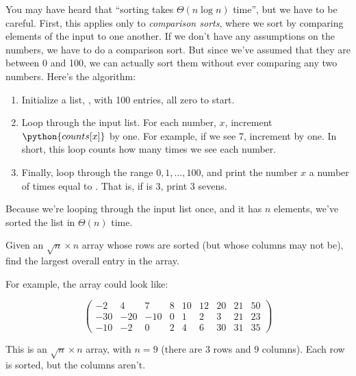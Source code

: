\begin{prob}
\begin{subprobset}
\begin{subprob}
\begin{soln}
                You may have heard that ``sorting takes $\Theta(n \log n)$ time'', but we have to be careful. First,
                this applies only to \emph{comparison sorts}, where we sort by comparing elements of the input to one another.
                If we don't have any assumptions on the numbers, we have to do a comparison sort. But since we've assumed that
                they are between 0 and 100, we can actually sort them without ever comparing any two numbers. Here's the algorithm:

                \begin{enumerate}
                    \item Initialize a list, , with 100 entries, all zero to start.
                    \item Loop through the input list. For each number, $x$, increment $\python{counts[x]}$ by one. For example, if we see
                        7, increment  by one. In short, this loop counts how many times we see each number.
                    \item Finally, loop through the range $0, 1, \ldots, 100$, and print the number $x$ a number of times equal to .
                        That is, if  is 3, print 3 sevens.
                \end{enumerate}

                Because we're looping through the input list once, and it has $n$ elements, we've sorted the list in $\Theta(n)$ time.
             \end{soln}

        \end{subprob}

        \begin{subprob}
            Given an $\sqrt{n} \times n$ array whose rows are sorted (but whose columns may not be), find the largest overall entry in the array.

            For example, the array could look like:

            \[
            \begin{pmatrix}
                -2 & 4 & 7 & 8 & 10 & 12 & 20 & 21 & 50\\
                -30 & -20 & -10 & 0 & 1 & 2 & 3 & 21 & 23\\
                -10 & -2 & 0 & 2 & 4 & 6 & 30 & 31 & 35
            \end{pmatrix}
            \]

            This is an $\sqrt n \times n$ array, with $n = 9$ (there are 3 rows and 9 columns). Each row is sorted, but the columns aren't.


\end{subprob}
\end{subprobset}
\end{prob}
